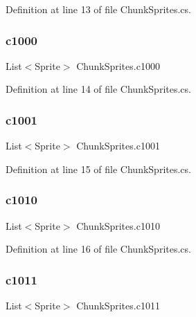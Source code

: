 Definition at line 13 of file Chunk\+Sprites.\+cs.

\mbox{\label{class_chunk_sprites_a945934271774eb74b06ebc7f274b4430}} 
\subsubsection{\texorpdfstring{c1000}{c1000}}
{\footnotesize\ttfamily List$<$Sprite$>$ Chunk\+Sprites.\+c1000}



Definition at line 14 of file Chunk\+Sprites.\+cs.

\mbox{\label{class_chunk_sprites_a3da5f025b8e42646ca3fd78339c70cf5}} 
\subsubsection{\texorpdfstring{c1001}{c1001}}
{\footnotesize\ttfamily List$<$Sprite$>$ Chunk\+Sprites.\+c1001}



Definition at line 15 of file Chunk\+Sprites.\+cs.

\mbox{\label{class_chunk_sprites_afc2f05d890635b391a2feca57379776b}} 
\subsubsection{\texorpdfstring{c1010}{c1010}}
{\footnotesize\ttfamily List$<$Sprite$>$ Chunk\+Sprites.\+c1010}



Definition at line 16 of file Chunk\+Sprites.\+cs.

\mbox{\label{class_chunk_sprites_a88c4a9896daa6fb90574de5fa700112c}} 
\subsubsection{\texorpdfstring{c1011}{c1011}}
{\footnotesize\ttfamily List$<$Sprite$>$ Chunk\+Sprites.\+c1011}



